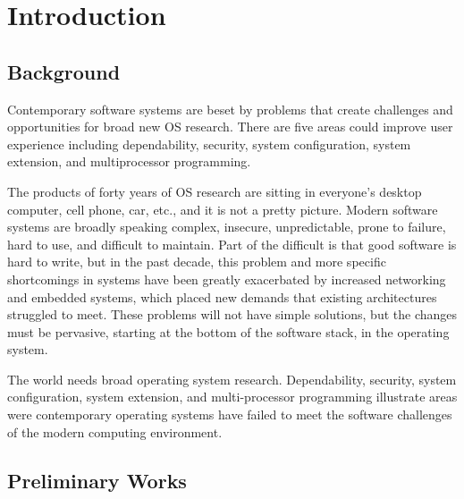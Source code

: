\documentclass{swfcthesis}
\begin{document}

\makepreliminarypages%
\frontmatter          
\tableofcontents     %
\listoffigures       %
\listoftables        %
\listoffixmes

\mainmatter

\chapter{Introduction}

\section{Background}
\label{sec:background}

Contemporary software systems are beset by problems that create challenges and
opportunities for broad new OS research. There are five areas could improve user
experience including dependability, security, system configuration, system extension, and
multiprocessor programming.

The products of forty years of OS research are sitting in everyone's desktop
computer, cell phone, car, etc., and it is not a pretty picture.
Modern software systems are broadly speaking complex, insecure, unpredictable, prone to
failure, hard to use, and difficult to maintain. Part of the difficult is that good
software is hard to write, but in the past decade, this problem and more specific
shortcomings in systems have been greatly exacerbated by increased networking and embedded
systems, which placed new demands that existing architectures struggled to meet. These
problems will not have simple solutions, but the changes must be pervasive, starting at
the bottom of the software stack, in the operating system.

The world needs broad operating system research. Dependability, security, system
configuration, system extension, and multi-processor programming
illustrate areas were contemporary operating systems have failed to meet the software
challenges of the modern computing environment.



\section{Preliminary Works}
\end{document}
